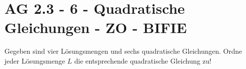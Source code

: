 \section{AG 2.3 - 6 - Quadratische Gleichungen  - ZO - BIFIE}

\begin{beispiel}[AG 2.3]{1} %
	
				Gegeben sind vier Lösungsmengen und sechs quadratische Gleichungen. Ordne jeder Lösungsmenge $L$ die entsprechende quadratische Gleichung zu!
\end{beispiel}